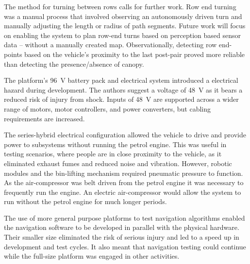 \documentclass[preprint,authoryear,12pt]{elsarticle}
\begin{document}
    The method for turning between rows calls for further work.
    Row end turning was a manual process that involved observing an autonomously driven turn and manually adjusting the length or radius of path segments.
    Future work will focus on enabling the system to plan row-end turns based on perception based sensor data -- without a manually created map.
    Observationally, detecting row end-points based on the vehicle's proximity to the last post-pair proved more reliable than detecting the presence/absence of canopy.

    The platform's \SI{96}{\volt} battery pack and electrical system introduced a electrical hazard during development.
    The authors suggest a voltage of \SI{48}{\volt} as it bears a reduced risk of injury from shock.
    Inputs of \SI{48}{\volt} are supported across a wider range of motors, motor controllers, and power converters, but cabling requirements are increased.

    The series-hybrid electrical configuration allowed the vehicle to drive and provide power to subsystems without running the petrol engine.
    This was useful in testing scenarios, where people are in close proximity to the vehicle, as it eliminated exhaust fumes and reduced noise and vibration.
    However, robotic modules and the bin-lifting mechanism required pneumatic pressure to function.
    As the air-compressor was belt driven from the petrol engine it was necessary to frequently run the engine.
    An electric air-compressor would allow the system to run without the petrol engine for much longer periods.

    The use of more general purpose platforms to test navigation algorithms enabled the navigation software to be developed in parallel with the physical hardware.
    Their smaller size eliminated the risk of serious injury and led to a speed up in development and test cycles.
    It also meant that navigation testing could continue while the full-size platform was engaged in other activities.

\end{document}
